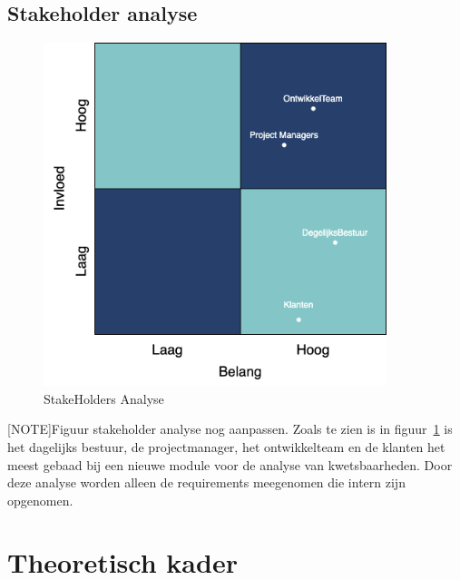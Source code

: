 \subsection{Stakeholder analyse}\label{subsec:stakeholder-analyse1}
\begin{figure}[H]
    \myfloatalign
    \includegraphics[width=10cm]{gfx/stakeholderanalyse}
    \caption{StakeHolders Analyse}
    \label{fig:StakeholderAnalyse1}
\end{figure}
[NOTE]Figuur stakeholder analyse nog aanpassen.
Zoals te zien is in figuur~\ref{fig:StakeholderAnalyse1} is het dagelijks bestuur, de projectmanager, het ontwikkelteam en de klanten het meest gebaad bij een nieuwe module voor de analyse van kwetsbaarheden.
Door deze analyse worden alleen de requirements meegenomen die intern zijn opgenomen.


\section{Theoretisch kader}\label{sec:theoretisch-kader}

